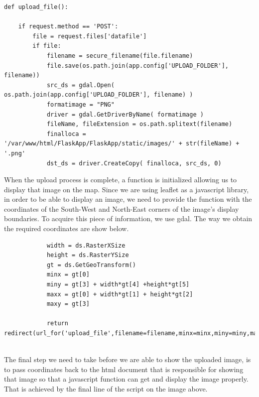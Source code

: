 \begin{lstlisting}
def upload_file():

	if request.method == 'POST':
		file = request.files['datafile']
		if file:
			filename = secure_filename(file.filename)
			file.save(os.path.join(app.config['UPLOAD_FOLDER'], filename))
			src_ds = gdal.Open( os.path.join(app.config['UPLOAD_FOLDER'], filename) )
			formatimage = "PNG"
			driver = gdal.GetDriverByName( formatimage )
			fileName, fileExtension = os.path.splitext(filename)
			finalloca = '/var/www/html/FlaskApp/FlaskApp/static/images/' + str(fileName) + '.png'
			dst_ds = driver.CreateCopy( finalloca, src_ds, 0)
\end{lstlisting}

When the upload process is complete, a function is initialized allowing us to display that image on the map. Since we are using leaflet as a javascript library, in order to be able to display an image, we need to provide the function with the coordinates of the South-West and North-East corners of the image's display boundaries. To acquire this piece of information, we use gdal. The way we obtain the required coordinates are show below.\\

\begin{lstlisting}
			width = ds.RasterXSize
			height = ds.RasterYSize
			gt = ds.GetGeoTransform()
			minx = gt[0]
			miny = gt[3] + width*gt[4] +height*gt[5]
			maxx = gt[0] + width*gt[1] + height*gt[2]
			maxy = gt[3]

			return redirect(url_for('upload_file',filename=filename,minx=minx,miny=miny,maxx=maxx,maxy=maxy))
\end{lstlisting}\\

The final step we need to take before we are able to show the uploaded image, is to pass coordinates back to the html document that is responsible for showing that image so that a javascript function can get and display the image properly. That is achieved by the final line of the script on the image above.


